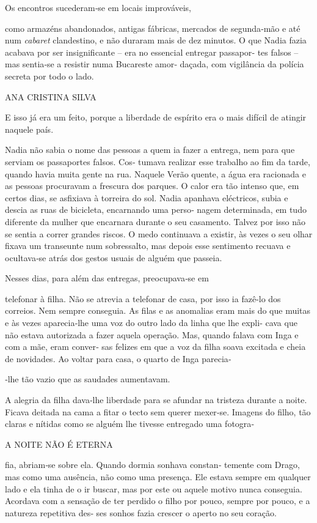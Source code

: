 Os encontros sucederam‑se em locais improváveis,

como armazéns abandonados, antigas fábricas, mercados de segunda‑mão e
até num \emph{cabaret }clandestino, e não duraram mais de dez minutos. O
que Nadia fazia acabava por ser insignificante -- era no essencial
entregar passapor‑ tes falsos -- mas sentia‑se a resistir numa Bucareste
amor‑ daçada, com vigilância da polícia secreta por todo o lado.

ANA CRISTINA SILVA

E isso já era um feito, porque a liberdade de espírito era o mais
difícil de atingir naquele país.

Nadia não sabia o nome das pessoas a quem ia fazer a entrega, nem para
que serviam os passaportes falsos. Cos‑ tumava realizar esse trabalho ao
fim da tarde, quando havia muita gente na rua. Naquele Verão quente, a
água era racionada e as pessoas procuravam a frescura dos parques. O
calor era tão intenso que, em certos dias, se asfixiava à torreira do
sol. Nadia apanhava eléctricos, subia e descia as ruas de bicicleta,
encarnando uma perso‑ nagem determinada, em tudo diferente da mulher que
encarnara durante o seu casamento. Talvez por isso não se sentia a
correr grandes riscos. O medo continuava a existir, às vezes o seu olhar
fixava um transeunte num sobressalto, mas depois esse sentimento recuava
e ocultava‑se atrás dos gestos usuais de alguém que passeia.

Nesses dias, para além das entregas, preocupava‑se em

telefonar à filha. Não se atrevia a telefonar de casa, por isso ia
fazê‑lo dos correios. Nem sempre conseguia. As filas e as anomalias eram
mais do que muitas e às vezes aparecia‑lhe uma voz do outro lado da
linha que lhe expli‑ cava que não estava autorizada a fazer aquela
operação. Mas, quando falava com Inga e com a mãe, eram conver‑ sas
felizes em que a voz da filha soava excitada e cheia de novidades. Ao
voltar para casa, o quarto de Inga parecia‑

‑lhe tão vazio que as saudades aumentavam.

A alegria da filha dava‑lhe liberdade para se afundar na tristeza
durante a noite. Ficava deitada na cama a fitar o tecto sem querer
mexer‑se. Imagens do filho, tão claras e nítidas como se alguém lhe
tivesse entregado uma fotogra‑

A NOITE NÃO É ETERNA

fia, abriam‑se sobre ela. Quando dormia sonhava constan‑ temente com
Drago, mas como uma ausência, não como uma presença. Ele estava sempre
em qualquer lado e ela tinha de o ir buscar, mas por este ou aquele
motivo nunca conseguia. Acordava com a sensação de ter perdido o filho
por pouco, sempre por pouco, e a natureza repetitiva des‑ ses sonhos
fazia crescer o aperto no seu coração.

